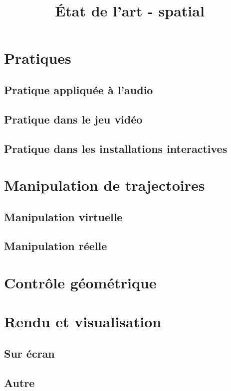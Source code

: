 \documentclass[french,12pt]{article}
\title{État de l'art - spatial}
\begin{document}
    \maketitle
    
    \section{Pratiques}
    \subsection{Pratique appliquée à l'audio}
    \subsection{Pratique dans le jeu vidéo}
    \subsection{Pratique dans les installations interactives}
    
    \section{Manipulation de trajectoires}
    \subsection{Manipulation virtuelle}
    \subsection{Manipulation réelle}

    \section{Contrôle géométrique}
    
    
    \section{Rendu et visualisation}
    \subsection{Sur écran}
    \subsection{Autre}
\printbibliography
\end{document}
